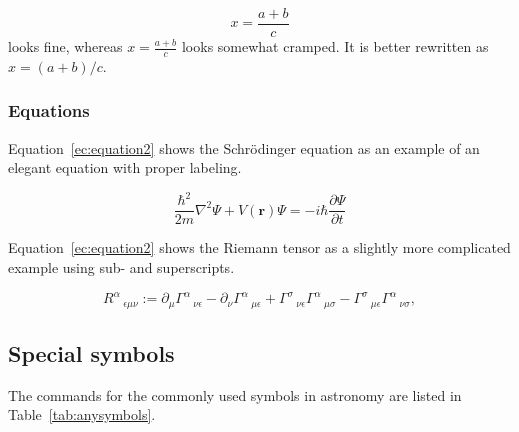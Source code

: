 \documentclass[9pt,twoside]{rmaa-rho-class/rmaa-rho_light}
\begin{document}
        \begin{equation} \label{ec:Equation1}
            x = \frac { a + b } { c } 
        \end{equation}
    looks fine, whereas $x = \frac { a + b } { c }$ looks somewhat cramped. It is better rewritten as $x = (a + b) / c $. 

    \subsubsection{Equations}

        Equation~\ref{ec:equation2} shows the Schrödinger equation as an example of an elegant equation with proper labeling.

    \begin{equation} \label{ec:equation2}
         \frac{\hbar^2}{2m}\nabla^2\Psi + V(\mathbf{r})\Psi = -i\hbar \frac{\partial\Psi}{\partial t}
    \end{equation} 

    Equation~\ref{ec:equation2} shows the Riemann tensor as a slightly more complicated example using sub- and superscripts.

    \begin{equation} \label{ec:equation3}
        R^\alpha\,_{\epsilon\mu\nu}:=\partial_\mu\Gamma^\alpha\,_{\nu\epsilon}
	-\partial_\nu\Gamma^\alpha\,_{\mu\epsilon}
	+\Gamma^\sigma\,_{\nu\epsilon} \Gamma^\alpha\,_{\mu\sigma}
	-\Gamma^\sigma\,_{\mu\epsilon} \Gamma^\alpha\,_{\nu\sigma},
    \end{equation}
    
    
    \subsection{Special symbols}

        The commands for the commonly used symbols in astronomy are listed in Table~\ref{tab:anysymbols}.
\end{document}
